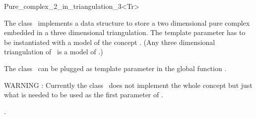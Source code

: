

\begin{ccRefClass}{Pure_complex_2_in_triangulation_3<Tr>}  %


\ccDefinition
  
The class \ccRefName\  implements a data structure to store
a two dimensional pure  complex 
embedded in a three dimensional triangulation.
The template parameter  has to be instantiated
with a model of the concept .
(Any three dimensional   triangulation of
\cgal\ is a model of .)

The class \ccRefName\  can be plugged as template parameter
in the global function .




\ccIsModel


WARNING :
Currently the class  \ccRefName\  does not implement the
whole concept 
but just what is needed to  be used as the first  parameter 
of  .








\ccSeeAlso

.



\end{ccRefClass}
